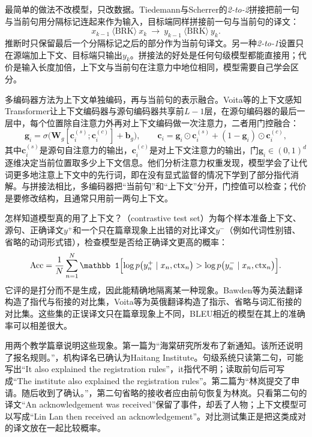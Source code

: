 最简单的做法不改模型，只改数据。Tiedemann与Scherrer的\emph{2-to-2}拼接把前一句与当前句用分隔标记连起来作为输入，目标端同样拼接前一句与当前句的译文\cite{nlp-gen-tiedemann2017context}：
\[
  x_{k-1}\ \langle\mathrm{BRK}\rangle\ x_k\ \longrightarrow\ y_{k-1}\ \langle\mathrm{BRK}\rangle\ y_k .
\]
推断时只保留最后一个分隔标记之后的部分作为当前句译文。另一种\emph{2-to-1}设置只在源端加上下文、目标端只输出$y_k$。拼接法的好处是任何句级模型都能直接用；代价是输入长度加倍，上下文与当前句在注意力中地位相同，模型需要自己学会区分。

多编码器方法为上下文单独编码，再与当前句的表示融合。Voita等的上下文感知Transformer让上下文编码器与源句编码器共享前$L-1$层，在源句编码器的最后一层中，每个位置除自注意力外再对上下文编码做一次注意力，二者用门控融合\cite{nlp-gen-voita2018anaphora}：
\begin{equation}
  \bm g_i=\sigma\bigl(\bm W_g[\bm c^{(s)}_i;\bm c^{(c)}_i]+\bm b_g\bigr),\qquad
  \bm c_i=\bm g_i\odot\bm c^{(s)}_i+(1-\bm g_i)\odot\bm c^{(c)}_i,
  \label{eq:nlp-generation-context-gate}
\end{equation}
其中$\bm c^{(s)}_i$是源句自注意力的输出，$\bm c^{(c)}_i$是对上下文注意力的输出，门$\bm g_i\in(0,1)^d$逐维决定当前位置取多少上下文信息。他们分析注意力权重发现，模型学会了让代词更多地注意上下文中的先行词，即在没有显式监督的情况下学到了部分指代消解。与拼接法相比，多编码器把“当前句”和“上下文”分开，门控值可以检查；代价是要修改结构，且通常只用前一两句上下文。

怎样知道模型真的用了上下文？（contrastive test set）为每个样本准备上下文、源句、正确译文$y^{+}$和一个只在篇章现象上出错的对比译文$y^{-}$（例如代词性别错、省略的动词形式错），检查模型是否给正确译文更高的概率：
\begin{equation}
  \mathrm{Acc}=\frac1N\sum_{n=1}^{N}\mathbb 1\Bigl[\log p\bigl(y^{+}_n\mid x_n,\mathrm{ctx}_n\bigr)>\log p\bigl(y^{-}_n\mid x_n,\mathrm{ctx}_n\bigr)\Bigr].
  \label{eq:nlp-generation-contrastive-accuracy}
\end{equation}
它评的是打分而不是生成，因此能精确地隔离某一种现象。Bawden等为英法翻译构造了指代与衔接的对比集\cite{nlp-gen-bawden2018discourse}，Voita等为英俄翻译构造了指示、省略与词汇衔接的对比集。这些集的正误译文只在篇章现象上不同，BLEU相近的模型在其上的准确率可以相差很大。

用两个教学篇章说明这些现象。第一篇为“海棠研究所发布了新通知。该所还说明了报名规则。”，机构译名已确认为Haitang Institute。句级系统只读第二句，可能写出“It also explained the registration rules”，it指代不明；读取前句后可写成“The institute also explained the registration rules”。第二篇为“林岚提交了申请。随后收到了确认。”，第二句省略的接收者应由前句恢复为林岚。只看第二句的译文“An acknowledgement was received”保留了事件，却丢了人物；上下文模型可以写成“Lin Lan then received an acknowledgement”。对比测试集正是把这类成对的译文放在一起比较概率。

